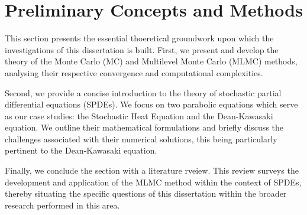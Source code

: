 \chapter{Preliminary Concepts and Methods}\label{chap:preliminary}

This section presents the essential thoeretical groundwork upon which the
investigations of this dissertation is built. First, we present and develop the theory 
of the Monte Carlo (MC) and Multilevel Monte Carlo (MLMC) methods, analysing their 
respective convergence and computational complexities. 

Second, we provide a concise introduction to the theory of stochastic partial differential 
equations (SPDEs). We focus on two parabolic equations which serve as our case studies: 
the Stochastic Heat Equation and the Dean-Kawasaki equation. We outline 
their mathematical formulations and briefly discuss the challenges 
associated with their numerical solutions, this being particularly pertinent to 
the Dean-Kawasaki equation.

Finally, we conclude the section with a literature rveiew. This review surveys the 
development and application of the MLMC method within the context of SPDEs, 
thereby situating the specific questions of this dissertation within the broader
research performed in this area.




